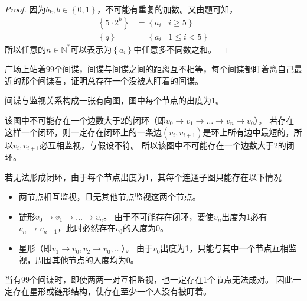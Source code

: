 \documentclass[answers]{exam}
\begin{document}
\begin{questions}
\begin{solution}
\begin{proof}
            因为$b_k, b \in \left\{0,1\right\}$，不可能有重复的加数。又由题可知，
            \begin{align*}
                \left\{5 \cdot 2^k \right\} & = \left\{a_i \mid i \geq 5 \right\}     \\
                \left\{q \right\}           & = \left\{a_i \mid 1 \leq i < 5 \right\}
            \end{align*}
            所以任意的$n \in \mathbb{N}^*$可以表示为$\left\{ a_i \right\}$中任意多不同数之和。
        \end{proof}
    \end{solution}

    \newpage %

    \question 广场上站着99个间谍，间谍与间谍之间的距离互不相等，每个间谍都盯着离自己最近的那个间谍看，证明总存在一个没被人盯着的间谍。

    \begin{solution}

        间谍与监视关系构成一张有向图，图中每个节点的出度为1。

        该图中不可能存在一个边数大于2的闭环（即$v_0 \rightarrow v_1 \rightarrow \dots \rightarrow v_n \rightarrow v_0 $）。
        若存在这样一个闭环，则一定存在闭环上的一条边$(v_i, v_{i+1})$是环上所有边中最短的，所以$v_i, v_{i+1}$必互相监视，与假设不符。
        所以该图中不可能存在一个边数大于2的闭环。

        若无法形成闭环，由于每个节点出度为1，其每个连通子图只能存在以下情况
        \begin{itemize}
            \item 两节点相互监视，且无其他节点监视这两个节点。
            \item 链形$v_0 \rightarrow v_1 \rightarrow \dots \rightarrow v_n$。
                  由于不可能存在闭环，要使$v_n$出度为1必有$v_n \rightarrow v_{n-1}$，此时必然存在$v_0$的入度为0。
            \item 星形（即$v_1 \rightarrow v_0, v_2 \rightarrow v_0,\dots $）。
                  由于$v_0$出度为1，只能与其中一个节点互相监视，周围其他节点的入度均为$0$。
        \end{itemize}

        当有99个间谍时，即使两两一对互相监视，也一定存在1个节点无法成对。
        因此一定存在星形或链形结构，使存在至少一个人没有被盯着。

    \end{solution}


\end{questions}
\end{document}
